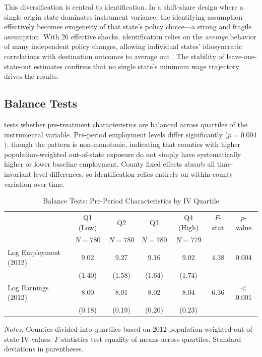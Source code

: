 \documentclass[12pt]{article}
\begin{document}
This diversification is central to identification. In a shift-share design where a single origin state dominates instrument variance, the identifying assumption effectively becomes exogeneity of that state's policy choice---a strong and fragile assumption. With 26 effective shocks, identification relies on the \textit{average} behavior of many independent policy changes, allowing individual states' idiosyncratic correlations with destination outcomes to average out \citep{borusyak2022quasi}. The stability of leave-one-state-out estimates confirms that no single state's minimum wage trajectory drives the results.

\subsection{Balance Tests}

 tests whether pre-treatment characteristics are balanced across quartiles of the instrumental variable. Pre-period employment levels differ significantly ($p = 0.004$), though the pattern is non-monotonic, indicating that counties with higher population-weighted out-of-state exposure do not simply have systematically higher or lower baseline employment. County fixed effects absorb all time-invariant level differences, so identification relies entirely on within-county variation over time.

\begin{table}[t]
\centering
\caption{Balance Tests: Pre-Period Characteristics by IV Quartile}
\label{tab:balance}
\begin{threeparttable}
\begin{tabular}{lcccccc}
\toprule
 & Q1 (Low) & Q2 & Q3 & Q4 (High) & $F$-stat & $p$-value \\
 & $N=780$ & $N=780$ & $N=780$ & $N=779$ & & \\
\midrule
Log Employment (2012) & 9.02 & 9.27 & 9.16 & 9.02 & 4.38 & 0.004 \\
 & (1.40) & (1.58) & (1.64) & (1.74) & & \\
Log Earnings (2012) & 8.00 & 8.01 & 8.02 & 8.04 & 6.36 & $<$0.001 \\
 & (0.18) & (0.19) & (0.20) & (0.23) & & \\
\bottomrule
\end{tabular}
\begin{tablenotes}[flushleft]
\small
\item \textit{Notes:} Counties divided into quartiles based on 2012 population-weighted out-of-state IV values. $F$-statistics test equality of means across quartiles. Standard deviations in parentheses.
\end{tablenotes}
\end{threeparttable}
\end{table}
\end{document}
